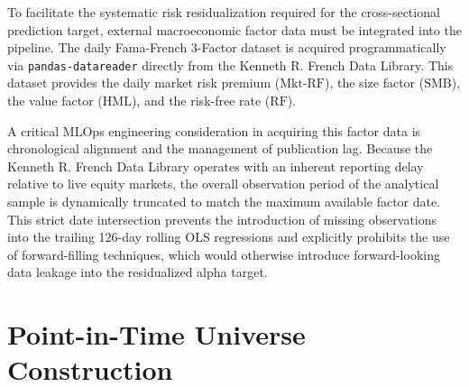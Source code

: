 To facilitate the systematic risk residualization required for the cross-sectional prediction target, external macroeconomic factor data must be integrated into the pipeline. The daily Fama-French 3-Factor dataset\cite{FamaFrench1992} is acquired programmatically via \texttt{pandas-datareader} directly from the Kenneth R. French Data Library. This dataset provides the daily market risk premium ($\mathrm{Mkt\text{-}RF}$), the size factor ($\mathrm{SMB}$), the value factor ($\mathrm{HML}$), and the risk-free rate ($\mathrm{RF}$).

\medskip

A critical MLOps engineering consideration in acquiring this factor data is chronological alignment and the management of publication lag. Because the Kenneth R. French Data Library operates with an inherent reporting delay relative to live equity markets, the overall observation period of the analytical sample is dynamically truncated to match the maximum available factor date. This strict date intersection prevents the introduction of missing observations into the trailing 126-day rolling OLS regressions and explicitly prohibits the use of forward-filling techniques, which would otherwise introduce forward-looking data leakage into the residualized alpha target.

\section{Point-in-Time Universe Construction}